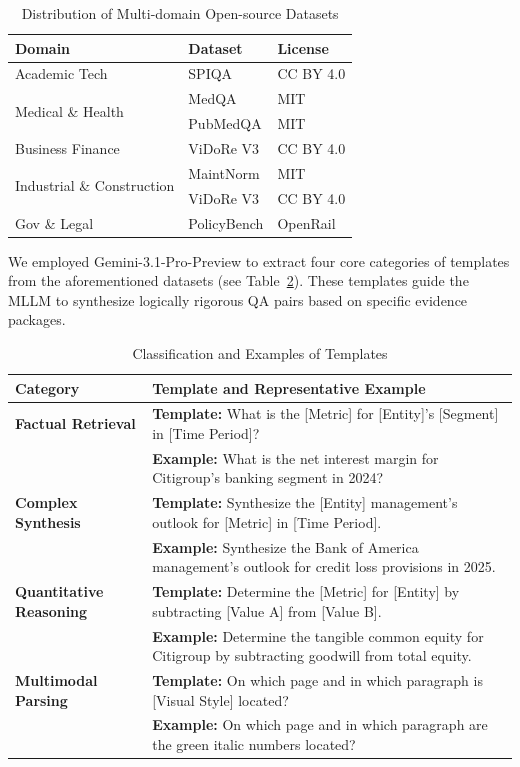 \documentclass{llmxive}
\begin{document}
{{{\begin{table}[htbp]
\centering
\small
\begin{tabular}{lll}
\toprule
\textbf{Domain} & \textbf{Dataset} & \textbf{License} \\
\midrule
Academic Tech & SPIQA \citep{pramanick2024spiqa} & CC BY 4.0 \\
\multirow{2}{*}{Medical \& Health} & MedQA \citep{jin2020disease} & MIT \\
 & PubMedQA \citep{jin2019pubmedqa} & MIT \\
Business Finance & ViDoRe V3 \citep{loison2026vidore} & CC BY 4.0 \\
\multirow{2}{*}{Industrial \& Construction} & MaintNorm \citep{bikaun2024maintnorm} & MIT \\
 & ViDoRe V3 \citep{loison2026vidore} & CC BY 4.0 \\
Gov \& Legal & PolicyBench \citep{foo2025know} & OpenRail \\
\bottomrule
\end{tabular}
\caption{Distribution of Multi-domain Open-source Datasets}
\label{tab:domain_datasets}
\end{table}

We employed Gemini-3.1-Pro-Preview to extract four core categories of templates from the aforementioned datasets (see Table~\ref{tab:template_examples}). These templates guide the MLLM to synthesize logically rigorous QA pairs based on specific evidence packages.

\begin{table}[htbp]
\centering
\small
\begin{tabularx}{\textwidth}{l|X}
\toprule
\textbf{Category} & \textbf{Template and Representative Example} \\
\midrule
\textbf{Factual Retrieval} & \textbf{Template:} What is the [Metric] for [Entity]'s [Segment] in [Time Period]? \\
 & \textbf{Example:} What is the net interest margin for Citigroup's banking segment in 2024? \\
\midrule
\textbf{Complex Synthesis} & \textbf{Template:} Synthesize the [Entity] management's outlook for [Metric] in [Time Period]. \\
 & \textbf{Example:} Synthesize the Bank of America management's outlook for credit loss provisions in 2025. \\
\midrule
\textbf{Quantitative Reasoning} & \textbf{Template:} Determine the [Metric] for [Entity] by subtracting [Value A] from [Value B]. \\
 & \textbf{Example:} Determine the tangible common equity for Citigroup by subtracting goodwill from total equity. \\
\midrule
\textbf{Multimodal Parsing} & \textbf{Template:} On which page and in which paragraph is [Visual Style] located? \\
 & \textbf{Example:} On which page and in which paragraph are the green italic numbers located? \\
\bottomrule
\end{tabularx}
\caption{Classification and Examples of Templates}
\label{tab:template_examples}
\end{table}

}}}
\end{document}
